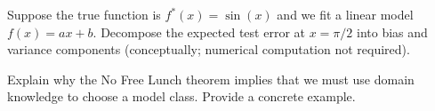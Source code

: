 \begin{exercise}
	Suppose the true function is $f^*(x) = \sin(x)$ and we fit a linear model $f(x) = ax + b$. Decompose the expected test error at $x = \pi/2$ into bias and variance components (conceptually; numerical computation not required).
\end{exercise}

\begin{exercise}
	Explain why the No Free Lunch theorem implies that we must use domain knowledge to choose a model class. Provide a concrete example.
\end{exercise}
